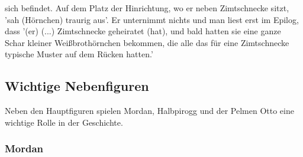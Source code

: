 sich befindet.\cite[S.599]{pir} Auf dem Platz der Hinrichtung, wo er neben Zimtschnecke sitzt, \cite[S.609]{pir} 'sah (Hörnchen) traurig aus'.\cite[S.609]{pir} Er unternimmt nichts und man liest erst im Epilog, dass '(er) (...) Zimtschnecke geheiratet (hat), und bald hatten sie eine ganze Schar kleiner Weißbrothörnchen bekommen, die alle das für eine Zimtschnecke typische Muster auf dem Rücken hatten.'\cite[S.644]{pir}

\subsection{Wichtige Nebenfiguren}
Neben den Hauptfiguren spielen Mordan, Halbpirogg und der Pelmen Otto eine wichtige Rolle in der Geschichte.

\subsubsection{Mordan}
